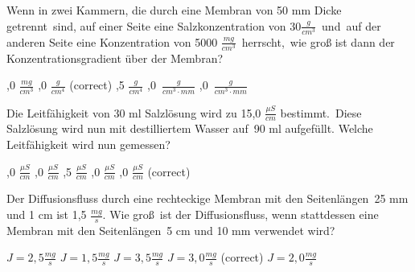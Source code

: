 \documentclass[11pt]{exam}
\begin{document}
\setlength{\voffset}{-0.5in}
\setlength{\headsep}{5pt}

\hspace{2mm}
 \hspace{5mm}
\vspace{4mm}

\begin{questions}

\question Wenn in zwei Kammern, die durch eine Membran von 50 mm Dicke getrennt sind, auf einer Seite eine Salzkonzentration von 30\( \frac{g}{cm^3} \) und auf der anderen Seite eine Konzentration von 5000 \( \frac{mg}{cm^3} \) herrscht, wie groß ist dann der Konzentrationsgradient über der Membran?

\begin{choices}
	,0 \( \frac{mg}{cm^3} \)
	,0 \( \frac{g}{cm^4} \) (correct)
	,5 \( \frac{g}{cm^4} \)
	,0 \( \frac{g}{cm^3\cdot mm} \)
	,0 \( \frac{g}{cm^3\cdot mm} \)
\end{choices}

\vspace{3mm}\question Die Leitfähigkeit von 30 ml Salzlösung wird zu 15,0 \( \frac{\mu S}{cm} \) bestimmt. Diese Salzlösung wird nun mit destilliertem Wasser auf 90 ml aufgefüllt. Welche Leitfähigkeit wird nun gemessen?

\begin{choices}
	,0 \( \frac{\mu S}{cm} \)
	,0 \( \frac{\mu S}{cm} \)
	,5 \( \frac{\mu S}{cm} \)
	,0 \( \frac{\mu S}{cm} \)
	,0 \( \frac{\mu S}{cm} \) (correct)
\end{choices}

\vspace{3mm}\question Der Diffusionsfluss durch eine rechteckige Membran mit den Seitenlängen 25 mm und 1 cm ist 1,5 \(\frac{mg}{s} \). Wie groß ist der Diffusionsfluss, wenn stattdessen eine Membran mit den Seitenlängen 5 cm und 10 mm verwendet wird?

\begin{choices}
	\choice \( J = 2,5 \frac{mg}{s} \)
	\choice \( J = 1,5 \frac{mg}{s} \)
	\choice \( J = 3,5 \frac{mg}{s} \)
	\choice \( J = 3,0 \frac{mg}{s} \) (correct)
	\choice \( J = 2,0 \frac{mg}{s} \)
\end{choices}


\end{questions}
\end{document}
